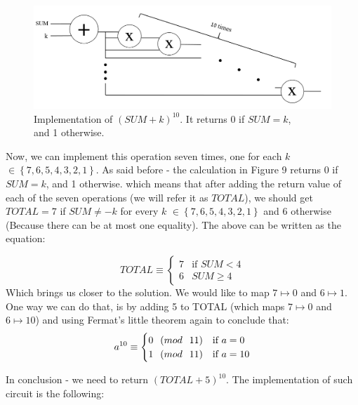 \documentclass{article}
\begin{document}
\begin{figure}[H]
    \centering
    \includegraphics[width=1\linewidth]{comparisonGate.png}
    \caption{Implementation of $(SUM+k)^{10}$. It returns 0 if $SUM=k$,\\ and 1 otherwise.}
    \label{fig:enter-label}
\end{figure}

Now, we can implement this operation seven times, one for each $k$ $\in \left\{ 7,6,5,4,3,2,1\right\}$. As said before - the calculation in Figure 9 returns 0 if $SUM=k$, and 1 otherwise. which means that after adding the return value of each of the seven operations (we will refer it as $TOTAL$), we should get $TOTAL=7$ if $SUM \neq -k$ for every $k$ $\in \left\{ 7,6,5,4,3,2,1\right\}$ and 6 otherwise (Because there can be at most one equality). The above can be written as the equation:

$$
TOTAL  \equiv\begin{cases}
			7 & \text{if $SUM < 4$}\\
            6  & \text{$SUM \geq  4$}
		 \end{cases} 
$$
Which brings us closer to the solution. We would like to map $7\mapsto 0$ and $6\mapsto 1$. One way we can do that, is by adding 5 to TOTAL (which maps $7\mapsto 0$ and $6\mapsto 10$) and using Fermat's little theorem again to conclude that:
$$
a^{10}  \equiv\begin{cases}
			0 \hspace{.25cm} (mod \hspace{.25cm}11) & \text{if $a = 0$}\\
            1 \hspace{.25cm} (mod \hspace{.25cm}11) & \text{if $a = 10$}
		 \end{cases}
$$

In conclusion - we need to return $(TOTAL+5)^{10}$. The implementation of such circuit is the following:
\end{document}
